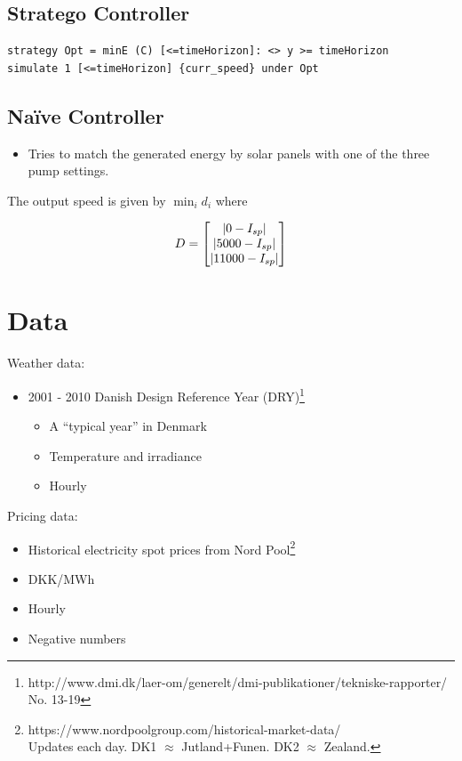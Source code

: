 \subsection{Stratego Controller}
\begin{verbatim}
strategy Opt = minE (C) [<=timeHorizon]: <> y >= timeHorizon
simulate 1 [<=timeHorizon] {curr_speed} under Opt
\end{verbatim}

\subsection{Na\"ive Controller}
\begin{itemize}
	\item Tries to match the generated energy by solar panels with one of the three pump settings.
\end{itemize}
The output speed is given by $\min_i d_i$ where

\[
D = \begin{bmatrix}
    |0-I_{sp}|\\
		|5000-I_{sp}|\\
		|11000-I_{sp}|
    \end{bmatrix}
\]

\section{Data}

Weather data:
\begin{itemize}
	\item 2001 - 2010 Danish Design Reference Year (DRY)\footnote{http://www.dmi.dk/laer-om/generelt/dmi-publikationer/tekniske-rapporter/\\No. 13-19}
	\begin{itemize}
		\item A ``typical year'' in Denmark
		\item Temperature and irradiance 
		\item Hourly
  \end{itemize}	
\end{itemize}


Pricing data:
\begin{itemize}
	\item Historical electricity spot prices from Nord Pool\footnote{https://www.nordpoolgroup.com/historical-market-data/ \\Updates each day. DK1 $\approx$ Jutland+Funen. DK2 $\approx$ Zealand.}
	\item DKK/MWh
	\item Hourly
	\item Negative numbers
\end{itemize}








